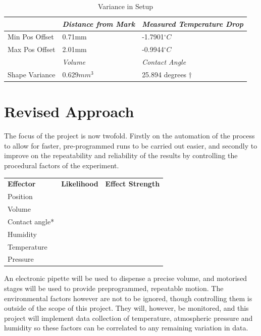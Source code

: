 \begin{table}[h]
    \centering
    \begin{tabular}{|l|l|l|}
    \hline
                   & \textit{Distance from Mark}          & \textit{Measured Temperature Drop} \\ \hline
    Min Pos Offset & 0.71mm                     &-1.7901$^{\circ}C$    \\ \hline
    Max Pos Offset &       2.01mm    &  -0.9944$^{\circ}C$    \\ \hline
                   & \textit{Volume}            & \textit{Contact Angle}          \\ \hline
    Shape Variance & $0.629mm^3$ & 25.894 degrees $\dagger$                \\ \hline
    \end{tabular}
    \caption{Variance in Setup}
    \end{table}


\section{Revised Approach}
The focus of the project is now twofold. Firstly on the automation of the process to allow for faster, pre-programmed runs to be carried out easier, and secondly to improve on the repeatability and reliability of the results by controlling the procedural factors of the experiment. 

\begin{table}[]
    \begin{tabular}{lll}
    \textbf{Effector} & \textbf{Likelihood} & \textbf{Effect Strength} \\
    Position          &                    &                          \\
    Volume            &                    &                          \\
    Contact angle*    &                    &                          \\
    Humidity          &                    &                          \\
    Temperature       &                    &                          \\
    Pressure          &                    &                         
    \end{tabular}
    \end{table}

An electronic pipette will be used to dispense a precise volume, and motorised stages will be used to provide preprogrammed, repeatable motion. The environmental factors however are not to be ignored, though controlling them is outside of the scope of this project. They will, however, be monitored, and this project will implement data collection of temperature, atmospheric pressure and humidity so these factors can be correlated to any remaining variation in data.  
